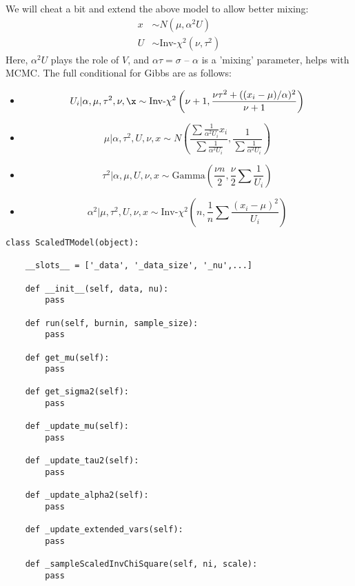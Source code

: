 \documentclass[8pt]{beamer}
\begin{document}
\begin{frame}
We will cheat a bit and extend the above model to allow better mixing:
	\begin{align*}
x &\sim N(\mu, \alpha^2U) \\
U &\sim \text{Inv-}\chi^2(\nu, \tau^2)
\end{align*}
\pause
Here, $\alpha^2U$ plays the role of $V$, and $\alpha\tau=\sigma$ -- $\alpha$ is a 'mixing' parameter, helps with MCMC.
The full conditional for Gibbs are as follows:
\begin{itemize}
	\item<3->\[ U_i| \alpha, \mu, \tau^2, \nu, \x \sim \text{Inv-}\chi^2\left(\nu+1, \frac{\nu\tau^2+ ((x_i-\mu)/\alpha)^2}{\nu+1}\right) \]
	\item<4->\[\mu|\alpha, \tau^2, U, \nu, x \sim N\left(\frac{\sum\frac{1}{\alpha^2U_i}x_i}{\sum\frac{1}{\alpha^2U_i}}, \frac{1}{\sum\frac{1}{\alpha^2U_i}} \right) \]
	\item<5->\[\tau^2 | \alpha, \mu, U, \nu, x \sim \text{Gamma}(\frac{\nu n}{2}, \frac{\nu}{2}\sum\frac{1}{U_i})\]
	\item<6->\[\alpha^2| \mu, \tau^2, U, \nu, x \sim \text{Inv-}\chi^2\left(n, \frac{1}{n}\sum\frac{(x_i-\mu)^2}{U_i}\right)\]
\end{itemize}

\end{frame}
\begin{frame}[fragile]
\begin{verbatim}
class ScaledTModel(object):

	__slots__ = ['_data', '_data_size', '_nu',...] 

	def __init__(self, data, nu):
		pass
		
	def run(self, burnin, sample_size):
		pass
		
	def get_mu(self):
		pass
		
	def get_sigma2(self):
		pass
		
	def _update_mu(self):
		pass
	
	def _update_tau2(self):
		pass
	
	def _update_alpha2(self):
		pass
	
	def _update_extended_vars(self):
		pass
		
	def _sampleScaledInvChiSquare(self, ni, scale):
		pass
	
\end{verbatim}
\end{frame}
\end{document}
